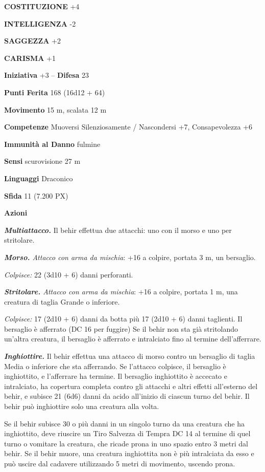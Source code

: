\begin{multicols}{2}
\textbf{COSTITUZIONE} +4

\textbf{INTELLIGENZA} -2

\textbf{SAGGEZZA} +2

\textbf{CARISMA} +1

\textbf{Iniziativa} +3 -- \textbf{Difesa} 23

\textbf{Punti Ferita} 168 (16d12 + 64)

\textbf{Movimento} 15 m, scalata 12 m

\textbf{Competenze} Muoversi Silenziosamente / Nascondersi +7, Consapevolezza +6

\textbf{Immunità al Danno} fulmine

\textbf{Sensi} scurovisione 27 m

\textbf{Linguaggi} Draconico

\textbf{Sfida} 11 (7.200 PX)

\textbf{Azioni}

\textit{\textbf{Multiattacco.}} Il behir effettua due attacchi: uno con il morso e uno per stritolare.

\textit{\textbf{Morso.} Attacco con arma da mischia}: +16 a colpire, portata 3 m, un bersaglio.

\textit{Colpisce:} 22 (3d10 + 6) danni perforanti.

\textit{\textbf{Stritolare.} Attacco con arma da mischia}: +16 a colpire, portata 1 m, una creatura di taglia Grande o inferiore.

\textit{Colpisce:} 17 (2d10 + 6) danni da botta più 17 (2d10 + 6) danni taglienti. Il bersaglio è afferrato (DC 16 per fuggire) Se il behir non sta già stritolando un'altra creatura, il bersaglio è afferrato e intralciato fino al termine dell'afferrare.

\textit{\textbf{Inghiottire.}} Il behir effettua una attacco di morso contro un bersaglio di taglia Media o inferiore che sta afferrando. Se l'attacco colpisce, il bersaglio è inghiottito, e l'afferrare ha termine. Il bersaglio inghiottito è accecato e intralciato, ha copertura completa contro gli attacchi e altri effetti all'esterno del behir, e subisce 21 (6d6) danni da acido all'inizio di ciascun turno del behir. Il behir può inghiottire solo una creatura alla volta.

Se il behir subisce 30 o più danni in un singolo turno da una creatura che ha inghiottito, deve riuscire un Tiro Salvezza di Tempra DC 14 al termine di quel turno o vomitare la creatura, che ricade prona in uno spazio entro 3 metri dal behir. Se il behir muore, una creatura inghiottita non è più intralciata da esso e può uscire dal cadavere utilizzando 5 metri di movimento, uscendo prona.


\end{multicols}
